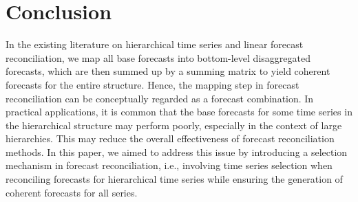 \documentclass[11pt,a4paper,]{article}
\begin{document}
\hypertarget{tbl-tourism-info}{}
\begin{table}[!h]
\caption{\label{tbl-tourism-info}Number of time series selected using different proposed methods and the
optimal parameter values identified in the tourism application. }\tabularnewline

\centering
{}
\end{table}

\hypertarget{sec-conclusion}{%
\section{Conclusion}\label{sec-conclusion}}

In the existing literature on hierarchical time series and linear
forecast reconciliation, we map all base forecasts into bottom-level
disaggregated forecasts, which are then summed up by a summing matrix to
yield coherent forecasts for the entire structure. Hence, the mapping
step in forecast reconciliation can be conceptually regarded as a
forecast combination. In practical applications, it is common that the
base forecasts for some time series in the hierarchical structure may
perform poorly, especially in the context of large hierarchies. This may
reduce the overall effectiveness of forecast reconciliation methods. In
this paper, we aimed to address this issue by introducing a selection
mechanism in forecast reconciliation, i.e., involving time series
selection when reconciling forecasts for hierarchical time series while
ensuring the generation of coherent forecasts for all series.
\end{document}
